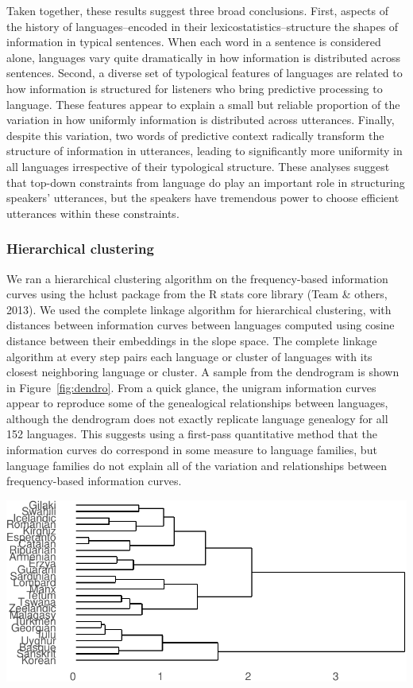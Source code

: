 \documentclass[man,floatsintext]{apa6}
\begin{document}
Taken together, these results suggest three broad conclusions. First, aspects of the history of languages--encoded in their lexicostatistics--structure the shapes of information in typical sentences. When each word in a sentence is considered alone, languages vary quite dramatically in how information is distributed across sentences. Second, a diverse set of typological features of languages are related to how information is structured for listeners who bring predictive processing to language. These features appear to explain a small but reliable proportion of the variation in how uniformly information is distributed across utterances. Finally, despite this variation, two words of predictive context radically transform the structure of information in utterances, leading to significantly more uniformity in all languages irrespective of their typological structure. These analyses suggest that top-down constraints from language do play an important role in structuring speakers' utterances, but the speakers have tremendous power to choose efficient utterances within these constraints.

\hypertarget{hierarchical-clustering}{%
\subsubsection{Hierarchical clustering}\label{hierarchical-clustering}}

We ran a hierarchical clustering algorithm on the frequency-based information curves using the hclust package from the R stats core library (Team \& others, 2013). We used the complete linkage algorithm for hierarchical clustering, with distances between information curves between languages computed using cosine distance between their embeddings in the slope space. The complete linkage algorithm at every step pairs each language or cluster of languages with its closest neighboring language or cluster. A sample from the dendrogram is shown in Figure~\ref{fig:dendro}. From a quick glance, the unigram information curves appear to reproduce some of the genealogical relationships between languages, although the dendrogram does not exactly replicate language genealogy for all 152 languages. This suggests using a first-pass quantitative method that the information curves do correspond in some measure to language families, but language families do not explain all of the variation and relationships between frequency-based information curves.

\includegraphics{figs/dendro-1.pdf}
\end{document}
